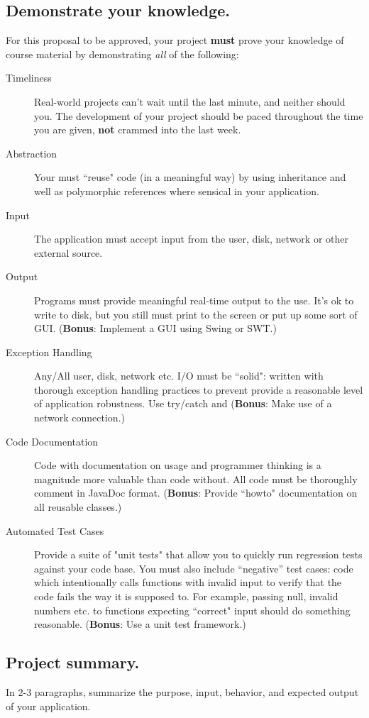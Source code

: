 \documentclass[12pt]{article}
\begin{document}
\subsection{Demonstrate your knowledge.}

For this proposal to be approved, your project {\bf must} prove your knowledge of course material by demonstrating {\it all} of the following:

\begin{description}
\item[Timeliness] Real-world projects can't wait until the last minute, and neither should you. The development of your project should be paced throughout the time you are given, {\bf not} crammed into the last week.
\item[Abstraction] Your must ``reuse" code (in a meaningful way) by using inheritance and well as polymorphic references where sensical in your application.
\item[Input] The application must accept input from the user, disk, network or other external source.
\item[Output] Programs must provide meaningful real-time output to the use. It's ok to write to disk, but you still must print to the screen or put up some sort of GUI. ({\bf Bonus}: Implement a GUI using Swing or SWT.)
\item[Exception Handling] Any/All user, disk, network etc. I/O must be ``solid": written with thorough exception handling practices to prevent provide a reasonable level of application robustness. Use try/catch and ({\bf Bonus}: Make use of a network connection.)
\item[Code Documentation] Code with documentation on usage and programmer thinking is a magnitude more valuable than code without. All code must be thoroughly comment in JavaDoc format. ({\bf Bonus}: Provide ``howto" documentation on all reusable classes.)
\item[Automated Test Cases] Provide a suite of "unit tests" that allow you to quickly run regression tests against your code base. You must also include ``negative'' test cases: code which intentionally calls functions with invalid input to verify that the code fails the way it is supposed to. For example, passing null, invalid numbers etc. to functions expecting ``correct" input should do something reasonable. ({\bf Bonus}: Use a unit test framework.) 
\end{description}

\subsection{Project summary.}
In 2-3 paragraphs, summarize the purpose, input, behavior, and expected output of your application.
\end{document}
